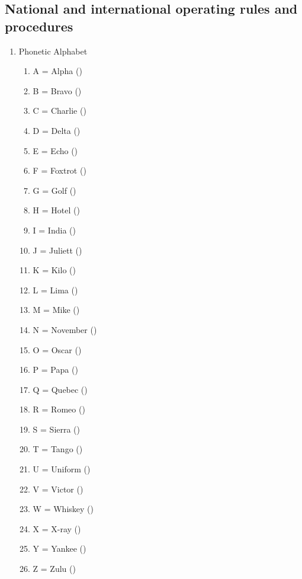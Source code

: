 \begin{flushleft}
\section[Rules and procedures]{National and international operating rules and procedures}

\begin{enumerate}

\item Phonetic Alphabet
\begin{enumerate}
\item A = Alpha ()\label{HAREC.b.1.1}
\item B = Bravo ()\label{HAREC.b.1.2}
\item C = Charlie ()\label{HAREC.b.1.3}
\item D = Delta ()\label{HAREC.b.1.4}
\item E = Echo ()\label{HAREC.b.1.5}
\item F = Foxtrot ()\label{HAREC.b.1.6}
\item G = Golf ()\label{HAREC.b.1.7}
\item H = Hotel ()\label{HAREC.b.1.8}
\item I = India ()\label{HAREC.b.1.9}
\item J = Juliett ()\label{HAREC.b.1.10}
\item K = Kilo ()\label{HAREC.b.1.11}
\item L = Lima ()\label{HAREC.b.1.12}
\item M = Mike ()\label{HAREC.b.1.13}
\item N = November ()\label{HAREC.b.1.14}
\item O = Oscar ()\label{HAREC.b.1.15}
\item P = Papa ()\label{HAREC.b.1.16}
\item Q = Quebec ()\label{HAREC.b.1.17}
\item R = Romeo ()\label{HAREC.b.1.18}
\item S = Sierra ()\label{HAREC.b.1.19}
\item T = Tango ()\label{HAREC.b.1.20}
\item U = Uniform ()\label{HAREC.b.1.21}
\item V = Victor ()\label{HAREC.b.1.22}
\item W = Whiskey ()\label{HAREC.b.1.23}
\item X = X-ray ()\label{HAREC.b.1.24}
\item Y = Yankee ()\label{HAREC.b.1.25}
\item Z = Zulu ()\label{HAREC.b.1.26}
\end{enumerate}


\end{enumerate}
\end{flushleft}

